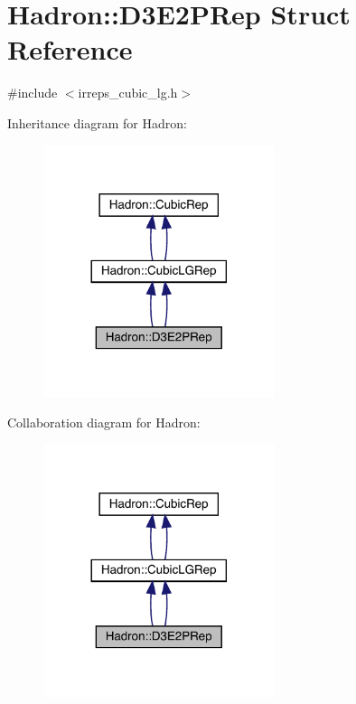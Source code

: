 \hypertarget{structHadron_1_1D3E2PRep}{}\section{Hadron\+:\+:D3\+E2\+P\+Rep Struct Reference}
\label{structHadron_1_1D3E2PRep}


{\ttfamily \#include $<$irreps\+\_\+cubic\+\_\+lg.\+h$>$}



Inheritance diagram for Hadron\+:\nopagebreak
\begin{figure}[H]
\begin{center}
\leavevmode
\includegraphics[width=192pt]{d5/d67/structHadron_1_1D3E2PRep__inherit__graph}
\end{center}
\end{figure}


Collaboration diagram for Hadron\+:\nopagebreak
\begin{figure}[H]
\begin{center}
\leavevmode
\includegraphics[width=192pt]{d0/df2/structHadron_1_1D3E2PRep__coll__graph}
\end{center}
\end{figure}
